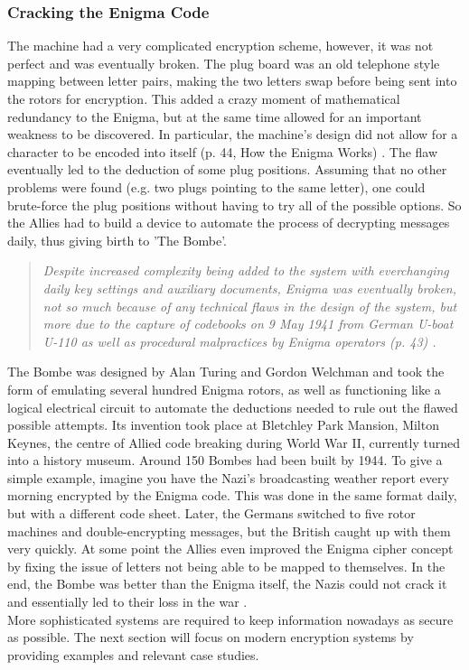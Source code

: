 \documentclass[a4paper, 12pt, titlepage]{article}
\begin{document}
\subsubsection{Cracking the Enigma Code}
The machine had a very complicated encryption scheme, however, it was not perfect and was eventually broken. The plug board was an old telephone style mapping between letter pairs, making the two letters swap before being sent into the rotors for encryption. This added a crazy moment of mathematical redundancy to the Enigma, but at the same time allowed for an important weakness to be discovered. In particular, the machine's design did not allow for a character to be encoded into itself (p. 44, How the Enigma Works) \cite{EnigmaInC}. The flaw eventually led to the deduction of some plug positions. Assuming that no other problems were found (e.g. two plugs pointing to the same letter), one could brute-force the plug positions without having to try all of the possible options. So the Allies had to build a device to automate the process of decrypting messages daily, thus giving birth to 'The Bombe'. 

\begin{quote}
\textit{Despite increased complexity being added to the system with everchanging daily key settings and auxiliary documents, Enigma was eventually broken, not so much because of any technical flaws in the design of the system, but more due to the capture of codebooks on 9 May 1941 from German U-boat U-110 as well as procedural malpractices by Enigma operators (p. 43) \cite{ClassicEnigma}.} \\[6pt]
\end{quote}
The Bombe was designed by Alan Turing and Gordon Welchman and took the form of emulating several hundred Enigma rotors, as well as functioning like a logical electrical circuit to automate the deductions needed to rule out the flawed possible attempts. Its invention took place at Bletchley Park Mansion, Milton Keynes, the centre of Allied code breaking during World War II, currently turned into a history museum. Around 150 Bombes had been built by 1944. To give a simple example, imagine you have the Nazi's broadcasting weather report every morning encrypted by the Enigma code. This was done in the same format daily, but with a different code sheet. Later, the Germans switched to five rotor machines and double-encrypting messages, but the British caught up with them very quickly. At some point the Allies even improved the Enigma cipher concept by fixing the issue of letters not being able to be mapped to themselves. In the end, the Bombe was better than the Enigma itself, the Nazis could not crack it and essentially led to their loss in the war \cite{ClassicEnigma}. \\[6pt]
More sophisticated systems are required to keep information nowadays as secure as possible. The next section will focus on modern encryption systems by providing examples and relevant case studies.
\end{document}
